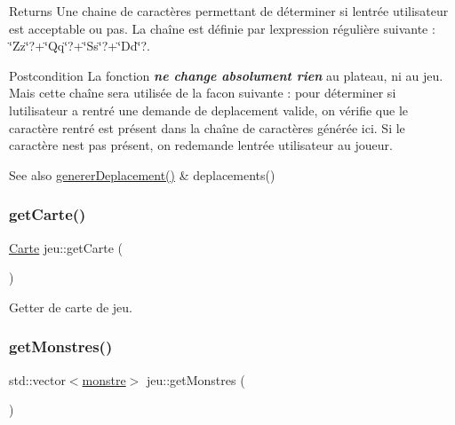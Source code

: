 \begin{DoxyItemize}
\begin{DoxyReturn}{Returns}
Une chaine de caractères permettant de déterminer si l\textquotesingle{}entrée utilisateur est acceptable ou pas. La chaîne est définie par l\textquotesingle{}expression régulière suivante \+: {\ttfamily \char`\"{}\+Zz\char`\"{}?+\char`\"{}\+Qq\char`\"{}?+\char`\"{}\+Ss\char`\"{}?+\char`\"{}\+Dd\char`\"{}?}. 
\end{DoxyReturn}
\begin{DoxyPostcond}{Postcondition}
La fonction {\itshape {\bfseries ne change absolument rien}} au plateau, ni au jeu. Mais cette chaîne sera utilisée de la facon suivante \+: pour déterminer si l\textquotesingle{}utilisateur a rentré une demande de deplacement valide, on vérifie que le caractère rentré est présent dans la chaîne de caractères générée ici. Si le caractère n\textquotesingle{}est pas présent, on redemande l\textquotesingle{}entrée utilisateur au joueur. 
\end{DoxyPostcond}
\begin{DoxySeeAlso}{See also}
\hyperlink{classjeu_a58d74300f8d64b3d3cd151e0838ef232}{generer\+Deplacement()} \& deplacements() 
\end{DoxySeeAlso}

\end{DoxyItemize}\mbox{\label{classjeu_ae2e46e1fdeb23fc643ed506b0df7f21f}} 
\subsubsection{\texorpdfstring{get\+Carte()}{getCarte()}}
{\footnotesize\ttfamily \hyperlink{class_carte}{Carte} jeu\+::get\+Carte (\begin{DoxyParamCaption}{ }\end{DoxyParamCaption})}



Getter de carte de jeu. 

\mbox{\label{classjeu_a22e7a7e7b932b935fa73658820038176}} 
\subsubsection{\texorpdfstring{get\+Monstres()}{getMonstres()}}
{\footnotesize\ttfamily std\+::vector$<$\hyperlink{classmonstre}{monstre}$>$ jeu\+::get\+Monstres (\begin{DoxyParamCaption}{ }\end{DoxyParamCaption})}



